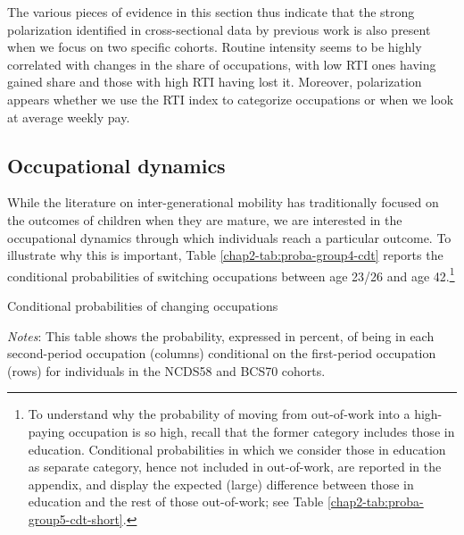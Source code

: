 The various pieces of evidence in this section thus indicate that the strong polarization identified in cross-sectional data by previous work is also present when we focus on two specific cohorts. Routine intensity seems to be highly correlated with changes in the share of occupations, with low RTI ones having gained share and those with high RTI having lost it. Moreover, polarization appears whether we use the RTI index to categorize occupations or when we look at average weekly pay.

\subsection{Occupational dynamics} \label{chap2-dynamics}

While the literature on inter-generational mobility has traditionally focused on the outcomes of children when they are mature, we are interested in the occupational dynamics through which individuals reach a particular outcome. To illustrate why this is important, Table \ref{chap2-tab:proba-group4-cdt} reports the conditional probabilities of switching occupations between age 23/26 and age 42.\footnote{To understand why the probability of moving from out-of-work into a high-paying occupation is so high, recall that the former category includes those in education. Conditional probabilities in which we consider those in education as separate category, hence not included in out-of-work, are reported in the appendix, and display the expected (large) difference between those in education and the rest of those out-of-work; see Table \ref{chap2-tab:proba-group5-cdt-short}.}

\begin{table}[!tb]
    \centering
    \caption{Conditional probabilities of changing occupations}
    \label{chap2-tab:proba-group4-cdt}
    \begin{threeparttable}
        \small
        
        \begin{tablenotes}[flushleft]
            \footnotesize{\item \textit{Notes}: This table shows the probability, expressed in percent, of being in each second-period occupation (columns) conditional on the first-period occupation (rows) for individuals in the NCDS58 and BCS70 cohorts.}
        \end{tablenotes}
    \end{threeparttable}
\end{table}

